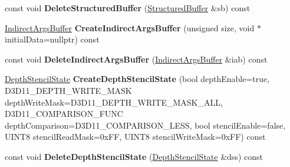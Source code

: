 \begin{DoxyCompactItemize}
\item 
const void {\bfseries Delete\+Structured\+Buffer} (\hyperlink{struct_ensum_1_1_graphics_1_1_structured_buffer}{Structured\+Buffer} \&sb) const \hypertarget{class_ensum_1_1_graphics_1_1_direct3_d11_a7a6698ae37a063a0ca9bbe6d649fe90f}{}\label{class_ensum_1_1_graphics_1_1_direct3_d11_a7a6698ae37a063a0ca9bbe6d649fe90f}

\item 
\hyperlink{struct_ensum_1_1_graphics_1_1_indirect_args_buffer}{Indirect\+Args\+Buffer} {\bfseries Create\+Indirect\+Args\+Buffer} (unsigned size, void $\ast$initial\+Data=nullptr) const \hypertarget{class_ensum_1_1_graphics_1_1_direct3_d11_aff12bd4ad62cfed85481cabd1f1424e4}{}\label{class_ensum_1_1_graphics_1_1_direct3_d11_aff12bd4ad62cfed85481cabd1f1424e4}

\item 
const void {\bfseries Delete\+Indirect\+Args\+Buffer} (\hyperlink{struct_ensum_1_1_graphics_1_1_indirect_args_buffer}{Indirect\+Args\+Buffer} \&iab) const \hypertarget{class_ensum_1_1_graphics_1_1_direct3_d11_a4daa1cbb069d7380a31080b7fce25d7e}{}\label{class_ensum_1_1_graphics_1_1_direct3_d11_a4daa1cbb069d7380a31080b7fce25d7e}

\item 
\hyperlink{struct_ensum_1_1_graphics_1_1_depth_stencil_state}{Depth\+Stencil\+State} {\bfseries Create\+Depth\+Stencil\+State} (bool depth\+Enable=true, D3\+D11\+\_\+\+D\+E\+P\+T\+H\+\_\+\+W\+R\+I\+T\+E\+\_\+\+M\+A\+SK depth\+Write\+Mask=D3\+D11\+\_\+\+D\+E\+P\+T\+H\+\_\+\+W\+R\+I\+T\+E\+\_\+\+M\+A\+S\+K\+\_\+\+A\+LL, D3\+D11\+\_\+\+C\+O\+M\+P\+A\+R\+I\+S\+O\+N\+\_\+\+F\+U\+NC depth\+Comparison=D3\+D11\+\_\+\+C\+O\+M\+P\+A\+R\+I\+S\+O\+N\+\_\+\+L\+E\+SS, bool stencil\+Enable=false, U\+I\+N\+T8 stencil\+Read\+Mask=0x\+F\+F, U\+I\+N\+T8 stencil\+Write\+Mask=0x\+F\+F) const \hypertarget{class_ensum_1_1_graphics_1_1_direct3_d11_a3202ea5e7bd4ca7b77fc0918e90bc373}{}\label{class_ensum_1_1_graphics_1_1_direct3_d11_a3202ea5e7bd4ca7b77fc0918e90bc373}

\item 
const void {\bfseries Delete\+Depth\+Stencil\+State} (\hyperlink{struct_ensum_1_1_graphics_1_1_depth_stencil_state}{Depth\+Stencil\+State} \&dss) const \hypertarget{class_ensum_1_1_graphics_1_1_direct3_d11_ab90c58cbc32683636eb2657c8787ca57}{}\label{class_ensum_1_1_graphics_1_1_direct3_d11_ab90c58cbc32683636eb2657c8787ca57}


\end{DoxyCompactItemize}
